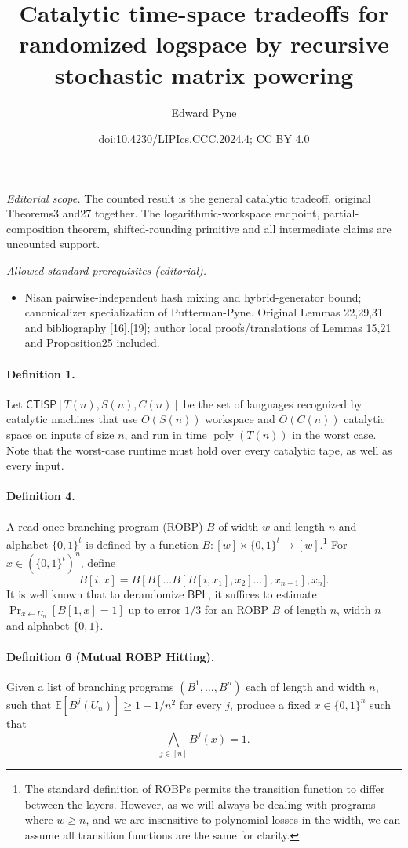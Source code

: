 \documentclass[10pt,a4paper]{article}
\title{Catalytic time-space tradeoffs for randomized logspace by recursive stochastic matrix powering}
\author{Edward Pyne}
\date{doi:10.4230/LIPIcs.CCC.2024.4; CC BY 4.0}
\begin{document}
\maketitle
\noindent\textit{Editorial scope.} The counted result is the general catalytic tradeoff, original Theorems3 and27 together. The logarithmic-workspace endpoint, partial-composition theorem, shifted-rounding primitive and all intermediate claims are uncounted support.\par\medskip
\noindent\textit{Allowed standard prerequisites (editorial).}\begin{itemize}
\item Nisan pairwise-independent hash mixing and hybrid-generator bound; canonicalizer specialization of Putterman-Pyne. Original Lemmas 22,29,31 and bibliography [16],[19]; author local proofs/translations of Lemmas 15,21 and Proposition25 included.
\end{itemize}\medskip
\paragraph{Definition 1.} Let $\mathsf{CTISP}[T(n),S(n),C(n)]$ be the set of languages recognized by catalytic machines that use $O(S(n))$ workspace and $O(C(n))$ catalytic space on inputs of size $n$, and run in time $\operatorname{poly}(T(n))$ in the worst case.
Note that the worst-case runtime must hold over every catalytic tape, as well as every input.
\paragraph{Definition 4.} A read-once branching program (ROBP) $B$ of width $w$ and length $n$ and alphabet $\{0,1\}^t$ is defined by a function $B:[w]\times\{0,1\}^t\to[w]$.\footnote{The standard definition of ROBPs permits the transition function to differ between the layers. However, as we will always be dealing with programs where $w\geq n$, and we are insensitive to polynomial losses in the width, we can assume all transition functions are the same for clarity.} For $x\in(\{0,1\}^t)^n$, define
\[B[i,x]=B[B[\ldots B[B[i,x_1],x_2]\ldots],x_{n-1}],x_n].\]
It is well known that to derandomize $\mathsf{BPL}$, it suffices to estimate $\Pr_{x\leftarrow U_n}[B[1,x]=1]$ up to error $1/3$ for an ROBP $B$ of length $n$, width $n$ and alphabet $\{0,1\}$.
\paragraph{Definition 6 (Mutual ROBP Hitting).} Given a list of branching programs $(B^1,\ldots,B^n)$ each of length and width $n$, such that $\mathbb{E}[B^j(U_n)]\geq1-1/n^2$ for every $j$, produce a fixed $x\in\{0,1\}^n$ such that
\[\bigwedge_{j\in[n]}B^j(x)=1.\]
\end{document}
